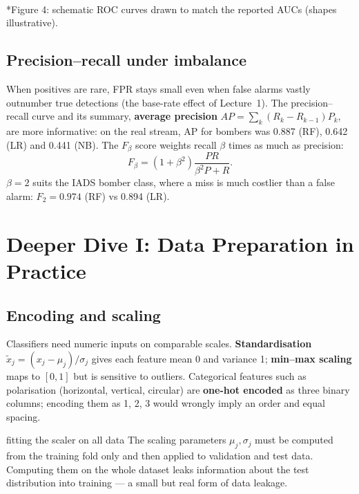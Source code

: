 \documentclass[11pt]{article}
\begin{document}
\begin{center}\\*{\small\color{GreyN}Figure 4: schematic ROC curves drawn to match the reported AUCs (shapes illustrative).}\end{center}
\subsection{Precision--recall under imbalance}
When positives are rare, FPR stays small even when false alarms vastly outnumber true detections (the base-rate effect of Lecture~1). The precision--recall curve and its summary, \textbf{average precision} $AP=\sum_k(R_k-R_{k-1})P_k$, are more informative: on the real stream, AP for bombers was 0.887 (RF), 0.642 (LR) and 0.441 (NB). The $F_\beta$ score weights recall $\beta$ times as much as precision:
\[F_\beta=(1+\beta^2)\frac{PR}{\beta^2P+R}.\]
$\beta=2$ suits the IADS bomber class, where a miss is much costlier than a false alarm: $F_2=0.974$ (RF) vs 0.894 (LR).

\section{Deeper Dive I: Data Preparation in Practice}
\subsection{Encoding and scaling}
Classifiers need numeric inputs on comparable scales. \textbf{Standardisation} $\tilde x_j=(x_j-\mu_j)/\sigma_j$ gives each feature mean 0 and variance 1; \textbf{min--max scaling} maps to $[0,1]$ but is sensitive to outliers. Categorical features such as polarisation (horizontal, vertical, circular) are \textbf{one-hot encoded} as three binary columns; encoding them as 1, 2, 3 would wrongly imply an order and equal spacing.
\begin{pitfall}{fitting the scaler on all data}
The scaling parameters $\mu_j,\sigma_j$ must be computed from the training fold only and then applied to validation and test data. Computing them on the whole dataset leaks information about the test distribution into training --- a small but real form of data leakage.
\end{pitfall}
\end{document}

